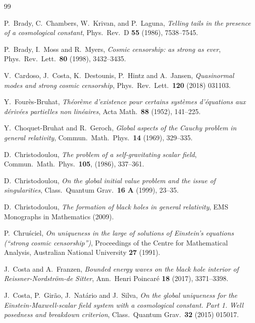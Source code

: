 \documentclass[a4paper,11pt,oneside,reqno]{amsart}
\begin{document}
\begin{thebibliography}{99}


{P.~Brady, C.~Chambers, W.~Krivan, and P.~Laguna}, \emph{Telling tails in the presence of a cosmological constant}, Phys.\ Rev.\ D {\bf 55} (1986), 7538--7545.

{P.~Brady, I.~Moss and R.~Myers}, \emph{{Cosmic censorship: as strong as ever}}, Phys.\ Rev.\ Lett.\ \textbf{80} (1998),
  3432--3435.

V.~Cardoso, J.~Costa, K.~Destounis, P.~Hintz and A.~Jansen, \emph{Quasinormal modes and strong cosmic censorship},  Phys.\ Rev.\ Lett.\ {\bf 120} (2018) 031103.

{Y.~Four\`{e}s-Bruhat}, \emph{Th\'{e}or\`{e}me d'existence pour certains syst\`{e}mes d'\'{e}quations aux d\'{e}riv\'{e}es partielles non lin\'{e}aires}, Acta Math.\ {\bf 88} (1952), 141--225.

{Y.~Choquet-Bruhat and R.~Geroch}, \emph{Global aspects of the Cauchy problem in general relativity}, Commun.\ Math.\ Phys.\ \textbf{14} (1969), 329--335.
    
{D.~Christodoulou}, \emph{The problem of a self-gravitating scalar field}, Commun.\ Math.\ Phys.\ {\bf 105}, (1986), 337--361.

{D.~Christodoulou}, \emph{{On the global initial value problem and the issue of singularities}}, Class.\ Quantum Grav.\ \textbf{16 A} (1999), 23--35.
  
{D.~Christodoulou}, \emph{{The formation of black holes in general relativity}}, EMS Monographs in Mathematics (2009).  

{P.~Chru\'sciel}, \emph{{On uniqueness in the large of solutions of Einstein's equations (``strong cosmic censorship'')}}, Proceedings of the Centre for Mathematical Analysis, Australian National University \textbf{27} (1991).

J.~Costa and A.~Franzen, \emph{Bounded energy waves on the black hole interior of Reissner-Nordstr\"om-de Sitter}, Ann.\ Henri Poincar\'e {\bf 18} (2017), 3371--3398.

{J.~Costa, P.~Gir\~ao, J.~Nat\'ario and J.~Silva}, \emph{{On the global uniqueness for the Einstein-Maxwell-scalar field system with a cosmological constant. Part 1.  Well posedness and breakdown criterion}}, Class.\ Quantum Grav.\ {\bf 32} (2015) 015017.


\end{thebibliography}
\end{document}
